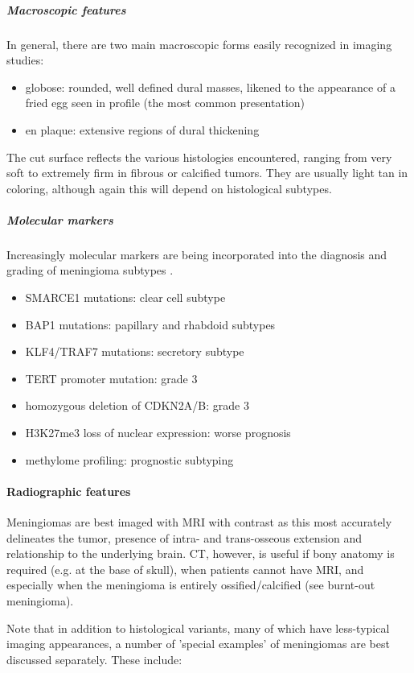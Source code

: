 \subparagraph{Macroscopic features}

In general, there are two main macroscopic forms easily recognized in imaging studies:

\begin{itemize}
	\item
	globose: rounded, well defined dural masses, likened to the appearance of a fried egg seen in profile (the most common presentation)
	\item
	en plaque: extensive regions of dural thickening
\end{itemize}

The cut surface reflects the various histologies encountered, ranging from very soft to extremely firm in fibrous or calcified tumors. They are usually light tan in coloring, although again this will depend on histological subtypes.

\subparagraph{Molecular markers}

Increasingly molecular markers are being incorporated into the diagnosis and grading of meningioma subtypes .

\begin{itemize}
	\item
	SMARCE1 mutations: clear cell subtype
	\item
	BAP1 mutations: papillary and rhabdoid subtypes
	\item
	KLF4/TRAF7 mutations: secretory subtype
	\item
	TERT promoter mutation: grade 3
	\item
	homozygous deletion of CDKN2A/B: grade 3
	\item
	H3K27me3 loss of nuclear expression: worse prognosis
	\item
	methylome profiling: prognostic subtyping
\end{itemize}

\paragraph{Radiographic features}

Meningiomas are best imaged with MRI with contrast as this most accurately delineates the tumor, presence of intra- and trans-osseous extension and relationship to the underlying brain. CT, however, is useful if bony anatomy is required (e.g. at the base of skull), when patients cannot have MRI, and especially when the meningioma is entirely ossified/calcified (see burnt-out meningioma).

Note that in addition to histological variants, many of which have less-typical imaging appearances, a number of 'special examples' of meningiomas are best discussed separately. These include:

